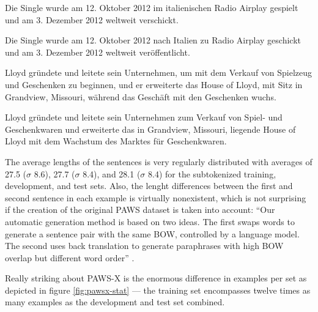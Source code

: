 \begin{examples}
  \item \label{itm:paws-x1} Die Single wurde am 12. Oktober 2012 im italienischen Radio Airplay gespielt und am 3. Dezember 2012 weltweit verschickt.

  Die Single wurde am 12. Oktober 2012 nach Italien zu Radio Airplay geschickt und am 3. Dezember 2012 weltweit veröffentlicht.
  \item \label{itm:paws-x2} Lloyd gründete und leitete sein Unternehmen, um mit dem Verkauf von Spielzeug und Geschenken zu beginnen, und er erweiterte das House of Lloyd, mit Sitz in Grandview, Missouri, während das Geschäft mit den Geschenken wuchs.

  Lloyd gründete und leitete sein Unternehmen zum Verkauf von Spiel- und Geschenkwaren und erweiterte das in Grandview, Missouri, liegende House of Lloyd mit dem Wachstum des Marktes für Geschenkwaren.
\end{examples}



The average lengths of the sentences is very regularly distributed with averages of 27.5
($\sigma$ 8.6), 27.7 ($\sigma$ 8.4), and 28.1 ($\sigma$ 8.4) for the subtokenized training,
development, and test sets. Also, the lenght differences between the first and second
sentence in each example is virtually nonexistent, which is not surprising if the creation
of the original PAWS dataset is taken into account: ``Our automatic generation method is
based on two ideas. The first swaps words to generate a sentence pair with the same BOW,
controlled by a language model. The second uses back translation to generate paraphrases
with high BOW overlap but different word order'' \citep{zhang2019paws}.

Really striking about PAWS-X is the enormous difference in examples per set
as depicted in figure \ref{fig:pawsx-stat} --- the training set encompasses
twelve times as many examples as the development and test set combined.

